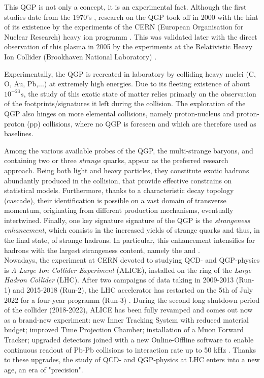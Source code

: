This QGP is not only a concept, it is an experimental fact. Although the first studies date from the 1970's \cite{carruthersQuarkiumBizarreFermi1974}\cite{harringtonHighDensityPhaseTransitions1974}\cite{collinsSuperdenseMatterNeutrons1975}, research on the QGP took off in 2000 with the hint of its existence by the experiments of the CERN (European Organisation for Nuclear Research) heavy ion programm \cite{NewStateMatter2023}. This was validated later with the direct observation of this plasma in 2005 by the experiments at the Relativistic Heavy Ion Collider (Brookhaven National Laboratory) \cite{ludlamHUNTINGQUARKGLUON2005}.

Experimentally, the QGP is recreated in laboratory by colliding heavy nuclei (C, O, Au, Pb,...) at extremely high energies. Due to its fleeting existence of about $10^{-23} s$, the study of this exotic state of matter relies primarly on the observation of the footprints/signatures it left during the collision. The exploration of the QGP also hinges on more elemental collisions, namely proton-nucleus and proton-proton (pp) collisions, where no QGP is foreseen and which are therefore used as baselines. 

Among the various available probes of the QGP, the multi-strange baryons, \rmXi and \rmOmega containing two or three \textit{strange} quarks, appear as the preferred research approach. Being both light and heavy particles, they constitute exotic hadrons abundantly produced in the collision, that provide effective constrains on statistical models. Furthermore, thanks to a characteristic decay topology (cascade), their identification is possible on a vast domain of transverse momentum, originating from different production mechanisms, eventually intertwined. Finally, one key signature signature of the QGP is the \textit{strangeness enhancement}, which consists in the increased yields of strange quarks and thus, in the final state, of strange hadrons. In particular, this enhancement intensifies for hadrons with the largest strangeness content, namely the \rmXi and \rmOmega.\\

Nowadays, the experiment at CERN devoted to studying QCD- and QGP-physics is \textit{A Large Ion Collider Experiment} (ALICE), installed on the ring of the \textit{Large Hadron Collider} (LHC). After two campaigns of data taking in 2009-2013 (Run-1) and 2015-2018 (Run-2), the LHC accelerator has restarted on the 5th of July 2022 for a four-year programm (Run-3) \cite{ThirdRunLarge2023}. During the second long shutdown period of the collider (2018-2022), ALICE has been fully revamped and comes out now as a brand-new experiment: new Inner Tracking System with reduced material budget; improved Time Projection Chamber; installation of a Muon Forward Tracker; upgraded detectors joined with a new Online-Offline software to enable continuous readout of Pb-Pb collisions to interaction rate up to 50 kHz \cite{alicecollaborationUpgradeALICEExperiment2014}. Thanks to these upgrades, the study of QCD- and QGP-physics at LHC enters into a new age, an era of "precision".


